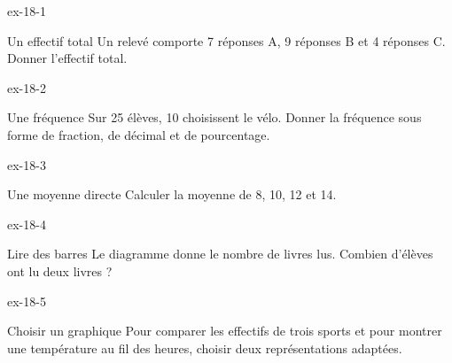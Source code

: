 \clearpage{}
\begin{blocLivre}{ex-18-1}\begin{exercice}[1]{Un effectif total}
Un relevé comporte 7 réponses A, 9 réponses B et 4 réponses C. Donner l’effectif total.
\end{exercice}\end{blocLivre}
\begin{blocLivre}{ex-18-2}\begin{exercice}[1]{Une fréquence}
Sur 25 élèves, 10 choisissent le vélo. Donner la fréquence sous forme de fraction, de décimal et de pourcentage.
\end{exercice}\end{blocLivre}
\begin{blocLivre}{ex-18-3}\begin{exercice}[1]{Une moyenne directe}
Calculer la moyenne de 8, 10, 12 et 14.
\end{exercice}\end{blocLivre}
\begin{blocLivre}{ex-18-4}\begin{exercice}[1]{Lire des barres}
Le diagramme donne le nombre de livres lus. Combien d’élèves ont lu deux livres ?
\label{fig-ex-18-4}
\end{exercice}\end{blocLivre}
\begin{blocLivre}{ex-18-5}\begin{exercice}[1]{Choisir un graphique}
Pour comparer les effectifs de trois sports et pour montrer une température au fil des heures, choisir deux représentations adaptées.
\end{exercice}\end{blocLivre}

